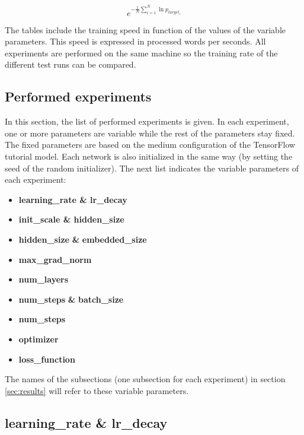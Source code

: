 \documentclass[10pt,a4paper,titlepage]{article}
\begin{document}
\[ e^{-\frac{1}{N} \sum_{i=1}^{N} \ln p_{target_{i}}} \]

\noindent
The tables include the training speed in function of the values of the variable parameters. This speed is expressed in processed words per seconds. All experiments are performed on the same machine so the training rate of the different test runs can be compared.

\subsection{Performed experiments}
\label{subsec:perf}

In this section, the list of performed experiments is given. In each experiment, one or more parameters are variable while the rest of the parameters stay fixed. The fixed parameters are based on the medium configuration of the TensorFlow tutorial model. Each network is also initialized in the same way (by setting the seed of the random initializer). The next list indicates the variable parameters of each experiment:

\begin{itemize}
	\item \textbf{learning\_rate \& lr\_decay}
	\item \textbf{init\_scale \& hidden\_size}
	\item \textbf{hidden\_size} \textbf{\&} \textbf{embedded\_size}
	\item \textbf{max\_grad\_norm}
	\item \textbf{num\_layers}
	\item \textbf{num\_steps} \textbf{\&} \textbf{batch\_size}
	\item \textbf{num\_steps}
	\item \textbf{optimizer}
	\item \textbf{loss\_function}
\end{itemize}

\noindent
The names of the subsections (one subsection for each experiment) in section \ref{sec:results} will refer to these variable parameters.

\newpage
\subsection{learning\_rate \& lr\_decay}
\end{document}
